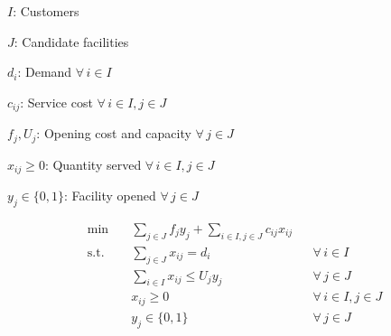 
\noindent $I$: Customers\par
\noindent $J$: Candidate facilities\par
\noindent $d_i$: Demand $\forall\,i\in I$\par
\noindent $c_{ij}$: Service cost $\forall\,i\in I,j\in J$\par
\noindent $f_j,U_j$: Opening cost and capacity $\forall\,j\in J$\par
\noindent $x_{ij}\geq0$: Quantity served $\forall\,i\in I,j\in J$\par
\noindent $y_j\in\{0,1\}$: Facility opened $\forall\,j\in J$\par
\begin{align}
  \min\quad &\sum_{j\in J}f_j y_j+\sum_{i\in I,j\in J}c_{ij}x_{ij} && \label{facility-location:0} \\
  \text{s.t.}\quad &\sum_{j\in J}x_{ij}=d_i &&\forall\,i\in I \label{facility-location:1} \\
  &\sum_{i\in I}x_{ij}\leq U_j y_j &&\forall\,j\in J \label{facility-location:2} \\
  &x_{ij}\geq0 &&\forall\,i\in I,j\in J \label{facility-location:3} \\
  &y_j\in\{0,1\} &&\forall\,j\in J \label{facility-location:4}
\end{align}
